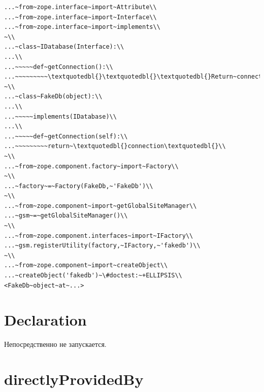 \documentclass[a4paper,openany,twoside,draft]{book}
\begin{document}
\begin{verbatim}
...~from~zope.interface~import~Attribute\\
...~from~zope.interface~import~Interface\\
...~from~zope.interface~import~implements\\
~\\
...~class~IDatabase(Interface):\\
...\\
...~~~~~def~getConnection():\\
...~~~~~~~~~\textquotedbl{}\textquotedbl{}\textquotedbl{}Return~connection~object\textquotedbl{}\textquotedbl{}\textquotedbl{}\\
~\\
...~class~FakeDb(object):\\
...\\
...~~~~~implements(IDatabase)\\
...\\
...~~~~~def~getConnection(self):\\
...~~~~~~~~~return~\textquotedbl{}connection\textquotedbl{}\\
~\\
...~from~zope.component.factory~import~Factory\\
~\\
...~factory~=~Factory(FakeDb,~'FakeDb')\\
~\\
...~from~zope.component~import~getGlobalSiteManager\\
...~gsm~=~getGlobalSiteManager()\\
~\\
...~from~zope.component.interfaces~import~IFactory\\
...~gsm.registerUtility(factory,~IFactory,~'fakedb')\\
~\\
...~from~zope.component~import~createObject\\
...~createObject('fakedb')~\#doctest:~+ELLIPSIS\\
<FakeDb~object~at~...>
\end{verbatim}


\section*{Declaration%
  \label{declaration}%
}

Непосредственно не запускается.


\section*{directlyProvidedBy%
  \label{directlyprovidedby}%
}
\end{document}
